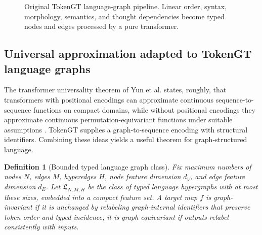 \documentclass[11pt]{article}
\newtheorem{definition}{Definition}[section]
\newcommand{\1}{\mathbf{1}}
\begin{document}
\begin{figure}[H]
\centering
{}
\caption{Original TokenGT language-graph pipeline. Linear order, syntax, morphology, semantics, and thought dependencies become typed nodes and edges processed by a pure transformer.}
\label{fig:tokengt_language}
\end{figure}

\subsection{Universal approximation adapted to TokenGT language graphs}

The transformer universality theorem of Yun et al. states, roughly, that transformers with positional encodings can approximate continuous sequence-to-sequence functions on compact domains, while without positional encodings they approximate continuous permutation-equivariant functions under suitable assumptions \cite{Yun2020}. TokenGT supplies a graph-to-sequence encoding with structural identifiers. Combining these ideas yields a useful theorem for graph-structured language.

\begin{definition}[Bounded typed language graph class]
Fix maximum numbers of nodes $N$, edges $M$, hyperedges $H$, node feature dimension $d_V$, and edge feature dimension $d_E$. Let $\mathfrak{L}_{N,M,H}$ be the class of typed language hypergraphs with at most these sizes, embedded into a compact feature set. A target map $f$ is graph-invariant if it is unchanged by relabeling graph-internal identifiers that preserve token order and typed incidence; it is graph-equivariant if outputs relabel consistently with inputs.
\end{definition}
\end{document}
